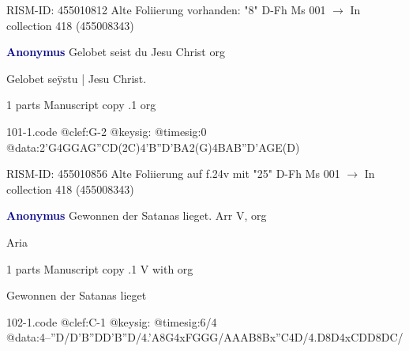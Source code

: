 \documentclass[twocolumn]{book}
\begin{document}
\newline RISM-ID: 455010812
\newline Alte Foliierung vorhanden: "8"
\newline D-Fh  Ms 001
\newline $\rightarrow$ In collection 418 (455008343)

\newline \par \vspace{7pt} \textcolor{darkblue}{\textbf{Anonymus  }}
\newline Gelobet seist du Jesu Christ    
\newline org
\newline \begin{itshape}[f.24v, at left:] Gelobet seÿstu | Jesu Christ.\end{itshape} 
\newline \textcolor{darkblue}{}  1 parts  
\newline Manuscript copy
.1  org  
\begin{filecontents*}{101-1.code}
@clef:G-2
@keysig:
@timesig:0
@data:2'G4GGAG''CD(2C)4'B''D'BA2(G)4BAB''D'AGE(D)
\end{filecontents*}
\newline
%

\newline RISM-ID: 455010856
\newline Alte Foliierung auf f.24v mit "25"
\newline D-Fh  Ms 001
\newline $\rightarrow$ In collection 418 (455008343)

\newline \par \vspace{7pt} \textcolor{darkblue}{\textbf{Anonymus  }}
\newline Gewonnen der Satanas lieget. Arr    
\newline V, org
\newline \begin{itshape}[f.120v, heading:] Aria\end{itshape} 
\newline \textcolor{darkblue}{}  1 parts  
\newline Manuscript copy
.1  V with org
\newline \begin{footnotesize} Gewonnen der Satanas lieget \end{footnotesize}  
\begin{filecontents*}{102-1.code}
@clef:C-1
@keysig:
@timesig:6/4
@data:4--''D/D'B''DD'B''D/4.'A8G4xFGGG/AAAB{8Bx''C}4D/4.D8D4xCDD{8DC}/
\end{filecontents*}
\newline
%
\end{document}
